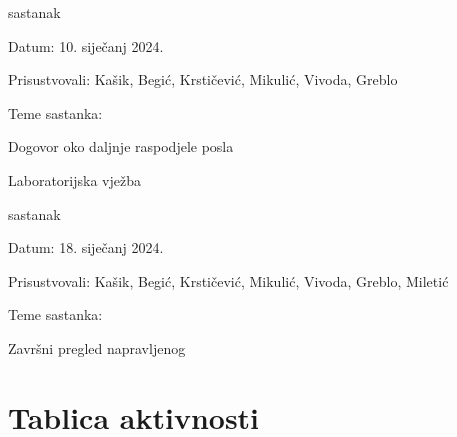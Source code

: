 \begin{packed_enum}
            \item  sastanak
			\item[] \begin{packed_item}
				\item Datum: 10. siječanj 2024.
				\item Prisustvovali: Kašik, Begić, Krstičević, Mikulić, Vivoda, Greblo
				\item Teme sastanka:
				\begin{packed_item}
					\item  Dogovor oko daljnje raspodjele posla
                    \item  Laboratorijska vježba
				\end{packed_item}
			\end{packed_item}

            \item  sastanak
			\item[] \begin{packed_item}
				\item Datum: 18. siječanj 2024.
				\item Prisustvovali: Kašik, Begić, Krstičević, Mikulić, Vivoda, Greblo, Miletić
				\item Teme sastanka:
				\begin{packed_item}
					\item  Završni pregled napravljenog
				\end{packed_item}
			\end{packed_item}
			
			
		\end{packed_enum}
		
		\eject
		\section*{Tablica aktivnosti}
		

